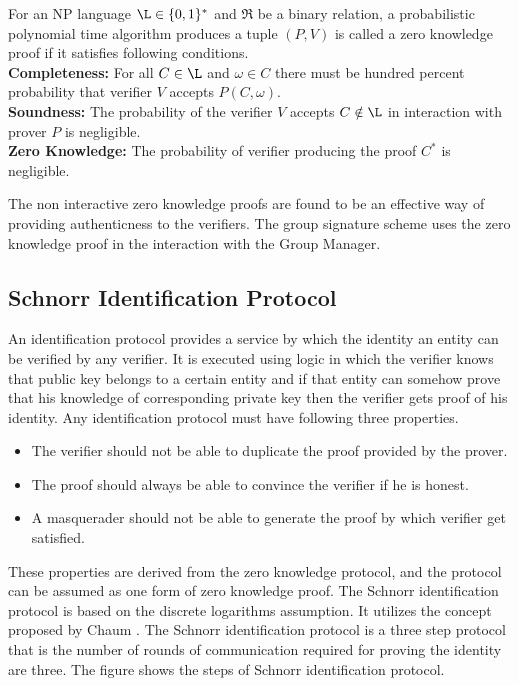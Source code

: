 \begin{definition} For an NP language $\L \in \{0, 1\}^*$ and $\Re$ be a binary relation, a probabilistic polynomial time algorithm produces a tuple $(P, V)$ is called a zero knowledge proof if it satisfies following conditions.\\
\textbf{Completeness:} For all $C \in \L$ and $\omega \in C$ there must be hundred percent probability that verifier $V$ accepts $P(C,\omega)$.\\
\textbf{Soundness:} The probability of the verifier $V$ accepts $C \notin \L$ in interaction with prover $P$ is negligible.\\
\textbf{Zero Knowledge:} The probability of verifier producing the proof $C^*$ is negligible.
\end{definition}

The non interactive zero knowledge proofs are found to be an effective way of providing authenticness to the verifiers. The group signature scheme uses the zero knowledge proof in the interaction with the Group Manager.

\subsection{Schnorr Identification Protocol}\label{subsection:Schnorr Identification Protocol}
 An identification protocol provides a service by which the identity an entity can be verified by any verifier. It is executed using logic in which the verifier knows that public key belongs to a certain entity and if that entity can somehow prove that his knowledge of corresponding private key then the verifier gets proof of his identity. Any identification protocol must have following three properties.
\begin{itemize}
\item The verifier should not be able to duplicate the proof provided by the prover.
\item The proof should always be able to convince the verifier if he is honest.
\item A masquerader should not be able to generate the proof by which verifier get satisfied.
\end{itemize}

These properties are derived from the zero knowledge protocol, and the protocol can be assumed as one form of zero knowledge proof. The Schnorr identification protocol is based on the discrete logarithms assumption. It utilizes the concept proposed by Chaum \cite{chaum1987improved}. The Schnorr identification protocol is a three step protocol \cite{schnorr1991efficient} that is the number of rounds of communication required for proving the identity are three. The figure shows the steps of Schnorr identification protocol.
 
